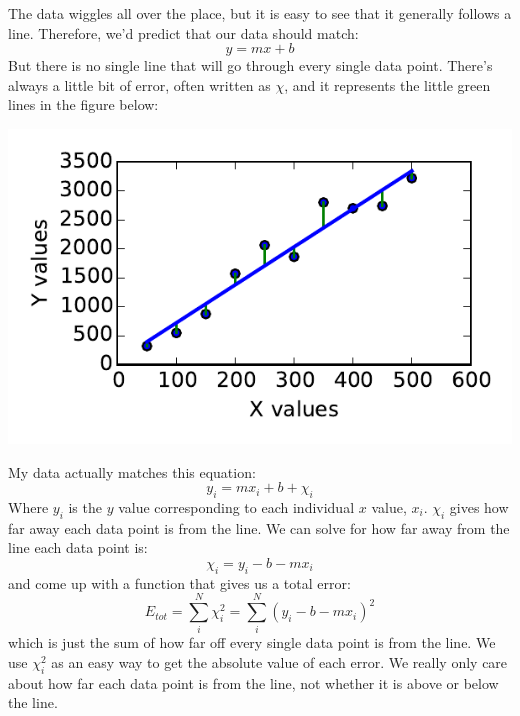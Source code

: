 \documentclass[twoside,11pt,ShortChapTitles]{BYUTextbook}
\begin{document}
The data wiggles all over the place, but it is easy to see that it generally follows a line.  Therefore, we'd predict that our data should match:
\[y=mx+b\]
But there is no single line that will go through every single data point.  There's always a little bit of error, often written as $\chi$, and it represents the little green lines in the figure below:
\begin{center}
\includegraphics{Lab4_figs/dataWfit.pdf}
\end{center}

My data actually matches this equation:
\[y_i=mx_i+b+\chi_i\]
Where $y_i$ is the $y$ value corresponding to each individual $x$ value, $x_i$.  $\chi_i$ gives how far away each data point is from the line. We can solve for how far away from the line each data point is:
\[\chi_i=y_i-b-mx_i\]
and come up with a function that gives us a total error:
\[E_{tot}=\sum_i^N \chi_i^2 = \sum_i^N (y_i-b-mx_i)^2\]
which is just the sum of how far off every single data point is from the line.  We use $\chi_i^2$ as an easy way to get the absolute value of each error.  We really only care about how far each data point is from the line, not whether it is above or below the line.
\end{document}
